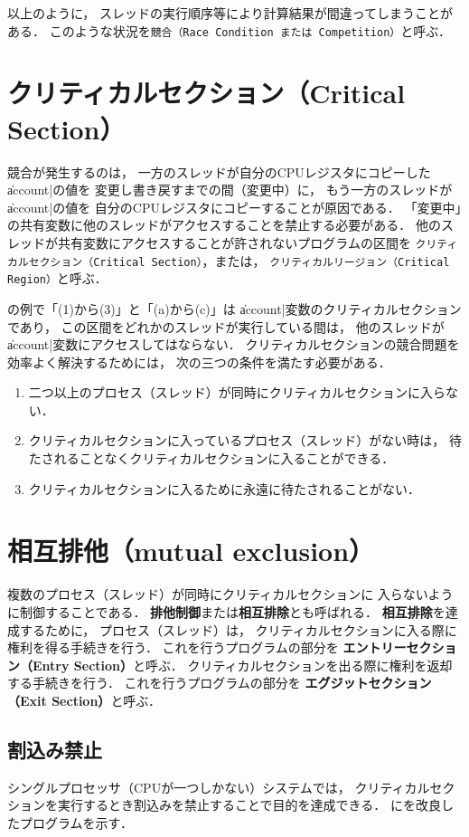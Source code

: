 以上のように，
スレッドの実行順序等により計算結果が間違ってしまうことがある．
このような状況を{\tt 競合（Race Condition または Competition）}と呼ぶ．

\section{クリティカルセクション（Critical Section）}
競合が発生するのは，
一方のスレッドが自分のCPUレジスタにコピーした\|account|の値を
変更し書き戻すまでの間（変更中）に，
もう一方のスレッドが\|account|の値を
自分のCPUレジスタにコピーすることが原因である．
「変更中」の共有変数に他のスレッドがアクセスすることを禁止する必要がある．
他のスレッドが共有変数にアクセスすることが許されないプログラムの区間を
{\tt クリティカルセクション（Critical Section）}，または，
{\tt クリティカルリージョン（Critical Region）}と呼ぶ．

の例で「(1)から(3)」と「(a)から(c)」は
\|account|変数のクリティカルセクションであり，
この区間をどれかのスレッドが実行している間は，
他のスレッドが\|account|変数にアクセスしてはならない．
クリティカルセクションの競合問題を効率よく解決するためには，
次の三つの条件を満たす必要がある．

\begin{enumerate}
\item 二つ以上のプロセス（スレッド）が同時にクリティカルセクションに入らない．
\item クリティカルセクションに入っているプロセス（スレッド）がない時は，
待たされることなくクリティカルセクションに入ることができる．
\item クリティカルセクションに入るために永遠に待たされることがない．
\end{enumerate}

\section{相互排他（mutual exclusion）}
複数のプロセス（スレッド）が同時にクリティカルセクションに
入らないように制御することである．
{\bf 排他制御}または{\bf 相互排除}とも呼ばれる．
{\bf 相互排除}を達成するために，
プロセス（スレッド）は，
クリティカルセクションに入る際に権利を得る手続きを行う．
これを行うプログラムの部分を
{\bf エントリーセクション（Entry Section）}と呼ぶ．
クリティカルセクションを出る際に権利を返却する手続きを行う．
これを行うプログラムの部分を
{\bf エグジットセクション（Exit Section）}と呼ぶ．

\subsection{割込み禁止}
\label{disableInterrupt}
シングルプロセッサ（CPUが一つしかない）システムでは，
クリティカルセクションを実行するとき割込みを禁止することで目的を達成できる．
にを改良したプログラムを示す．

